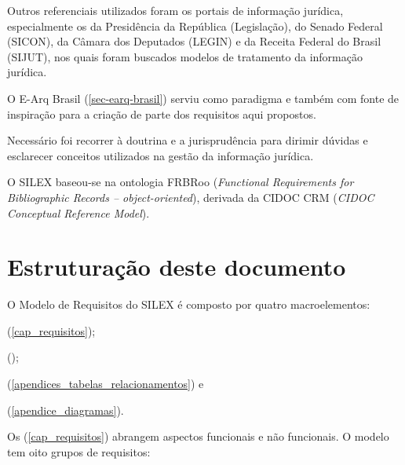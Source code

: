 \documentclass[a4paper,11pt,openright,twoside,english,brazil]{abntex2}
\begin{document}
Outros referenciais utilizados foram os portais de informação jurídica,
especialmente os da Presidência da República (Legislação), do Senado Federal
(SICON), da Câmara dos Deputados (LEGIN) e da Receita Federal do Brasil (SIJUT),
nos quais foram buscados modelos de tratamento da informação jurídica.

O E-Arq Brasil (\autoref{sec-earq-brasil}) serviu como paradigma e também com
fonte de inspiração para a criação de parte dos requisitos aqui propostos.

Necessário foi recorrer à doutrina e a jurisprudência para dirimir dúvidas e
esclarecer conceitos utilizados na gestão da informação jurídica.

O SILEX baseou-se na ontologia FRBRoo (\emph{Functional Requirements for
Bibliographic Records – object-oriented}), derivada da CIDOC CRM (\emph{CIDOC
Conceptual Reference Model}).

\section{Estruturação deste documento}

O Modelo de Requisitos do SILEX é composto por quatro macroelementos:
\begin{alineas}
  \item {} (\autoref{cap_requisitos});
  
  \item \hyperref[cap_glossario]{\glossaryname} ();
  
  \item {}
  (\autoref{apendices_tabelas_relacionamentos}) e
  
  \item {}
  (\autoref{apendice_diagramas}).
\end{alineas}


Os  (\autoref{cap_requisitos}) abrangem aspectos
funcionais e não funcionais. O modelo tem oito grupos de requisitos: 
\end{document}
